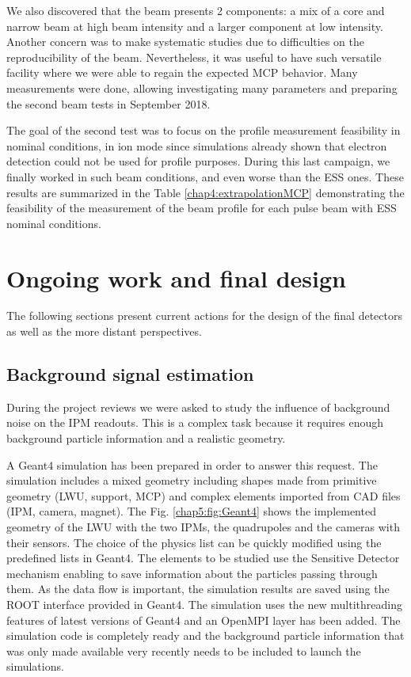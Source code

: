 We also discovered that the beam presents 2 components: a mix of a core and narrow beam at high beam intensity and a larger component at low intensity. Another concern was to make systematic studies due to difficulties on the reproducibility of the beam. Nevertheless, it was useful to have such versatile facility where we were able to regain the expected MCP behavior. Many measurements were done, allowing investigating many parameters and preparing the second beam tests in September 2018.

The goal of the second test was to focus on the profile measurement feasibility in nominal conditions, in ion mode since simulations already shown that electron detection could not be used for profile purposes. During this last campaign, we finally worked in such beam conditions, and even worse than the ESS ones. These results are summarized in the Table \ref{chap4:extrapolationMCP} demonstrating the feasibility of the measurement of the beam profile for each pulse beam with ESS nominal conditions.

\section*{Ongoing work and final design}

The following sections present current actions for the design of the final detectors as well as the more distant perspectives.
%
\subsection*{Background signal estimation}


During the project reviews we were asked to study the influence of background noise on the IPM readouts. This is a complex task because it requires enough background particle information  and a realistic geometry.

A Geant4 simulation has been prepared in order to answer this request. The simulation includes a mixed geometry including shapes made from primitive geometry (LWU, support, MCP) and complex elements imported from CAD files (IPM, camera, magnet). The Fig. \ref{chap5:fig:Geant4} shows the implemented geometry of the LWU with the two IPMs, the quadrupoles and the cameras with their sensors. The choice of the physics list can be quickly modified using the predefined lists in Geant4. The elements to be studied use the Sensitive Detector mechanism enabling to save information about the particles passing through them. As the data flow is important, the simulation results are saved using the ROOT interface provided in Geant4. The simulation uses the new multithreading features of latest versions of Geant4 and an OpenMPI layer has been added. The simulation code is completely ready and the background particle information that was only made available very recently needs to be included to launch the simulations.

